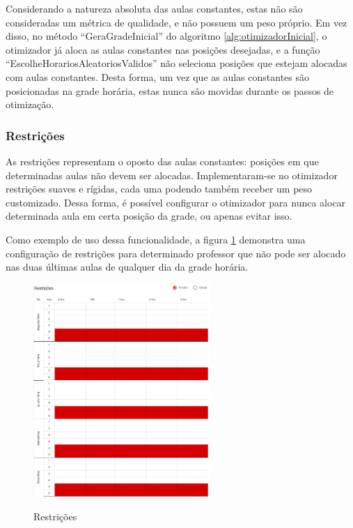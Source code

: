 Considerando a natureza absoluta das aulas constantes, estas não são consideradas um métrica de qualidade, e não possuem um peso próprio. Em vez disso, no método ``GeraGradeInicial'' do algoritmo \ref{alg:otimizadorInicial}, o otimizador já aloca as aulas constantes nas posições desejadas, e a função ``EscolheHorariosAleatoriosValidos'' não seleciona posições que estejam alocadas com aulas constantes. Desta forma, um vez que as aulas constantes são posicionadas na grade horária, estas nunca são movidas durante os passos de otimização.


\subsubsection{Restrições}

As restrições representam o oposto das aulas constantes: posições em que determinadas aulas não devem ser alocadas. Implementaram-se no otimizador restrições suaves e rígidas, cada uma podendo também receber um peso customizado. Dessa forma, é possível configurar o otimizador para nunca alocar determinada aula em certa posição da grade, ou apenas evitar isso.

Como exemplo de uso dessa funcionalidade, a figura \ref{fig:restricoes} demonstra uma configuração de restrições para determinado professor que não pode ser alocado nas duas últimas aulas de qualquer dia da grade horária.

\begin{figure}[h]
	\centering
	\caption{Restrições}
	\includegraphics[width=0.6\textwidth]{./dados/figuras/restricoes}
	\label{fig:restricoes}
\end{figure}

